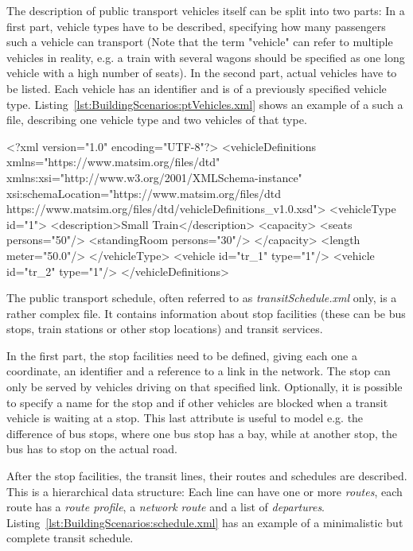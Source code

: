 The description of public transport vehicles itself can be split into two parts:
In a first part, vehicle types have to be described, specifying how many
passengers such a vehicle can transport (Note that the term "vehicle" can refer
to multiple vehicles in reality, e.g. a train with several wagons should be specified as
one long vehicle with a high number of seats). In the second part, actual
vehicles have to be listed. Each vehicle has an identifier and is of a previously
specified vehicle type. Listing~\ref{lst:BuildingScenarios:ptVehicles.xml} shows
an example of a such a file, describing one vehicle type and two vehicles of
that type.

\begin{xml-file}[caption=An example of transitVehicles.xml,
label=lst:BuildingScenarios:ptVehicles.xml]
<?xml version="1.0" encoding="UTF-8"?>
<vehicleDefinitions xmlns="https://www.matsim.org/files/dtd"
       xmlns:xsi="http://www.w3.org/2001/XMLSchema-instance"
       xsi:schemaLocation="https://www.matsim.org/files/dtd
                     https://www.matsim.org/files/dtd/vehicleDefinitions_v1.0.xsd">
<vehicleType id="1">
		<description>Small Train</description>
		<capacity>
			<seats persons="50"/>
			<standingRoom persons="30"/>
		</capacity>
		<length meter="50.0"/>
	</vehicleType>
	<vehicle id="tr_1" type="1"/>
	<vehicle id="tr_2" type="1"/>
</vehicleDefinitions>
\end{xml-file}

The public transport schedule, often referred to as \emph{transitSchedule.xml}
only, is a rather complex file. It contains information about stop facilities
(these can be bus stops, train stations or other stop locations) and transit
services.

In the first part, the stop facilities need to be defined, giving each one a
coordinate, an identifier and a reference to a link in the network. The stop can
only be served by vehicles driving on that specified link. Optionally, it is
possible to specify a name for the stop and if other vehicles are blocked
when a transit vehicle is waiting at a stop. This last attribute is useful to
model e.g. the difference of bus stops, where one bus stop has a bay, while at
another stop, the bus has to stop on the actual road.

After the stop facilities, the transit lines, their routes and schedules
are described. This is a hierarchical data structure: Each line can have one or
more \emph{routes}, each route has a \emph{route profile}, a \emph{network
route} and a list of \emph{departures}.
Listing~\ref{lst:BuildingScenarios:schedule.xml} has an example of a
minimalistic but complete transit schedule.

